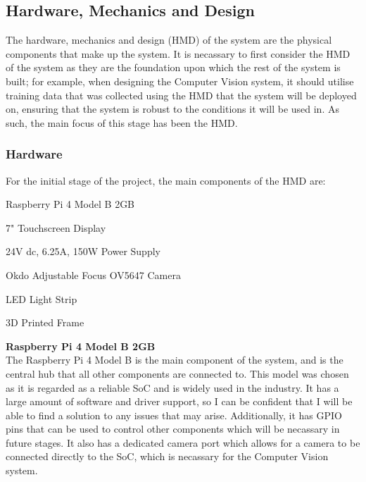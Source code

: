 \subsection{Hardware, Mechanics and Design}
The hardware, mechanics and design (HMD) of the system are the physical components that make up the system.
It is necassary to first consider the HMD of the system as they are the foundation upon which the rest of the system is built;
for example, when designing the Computer Vision system, it should utilise training data that was collected using the HMD 
that the system will be deployed on, ensuring that the system is robust to the conditions it will be used in. As such,
the main focus of this stage has been the HMD.
\subsubsection{Hardware}
For the initial stage of the project, the main components of the HMD are:
\begin{mylist}
  \item Raspberry Pi 4 Model B 2GB
  \item 7" Touchscreen Display
  \item 24V dc, 6.25A, 150W Power Supply
  \item Okdo Adjustable Focus OV5647 Camera
  \item LED Light Strip
  \item 3D Printed Frame
\end{mylist}
\textbf{Raspberry Pi 4 Model B 2GB} \\
The Raspberry Pi 4 Model B is the main component of the system, and is the central hub that all other components are connected to.
This model was chosen as it is regarded as a reliable SoC and is widely used in the industry. It has a large amount of software
and driver support, so I can be confident that I will be able to find a solution to any issues that may arise. Additionally, 
it has GPIO pins that can be used to control other components which will be necassary in future stages. It also has a 
dedicated camera port which allows for a camera to be connected directly to the SoC, which is necassary for the Computer Vision system.

